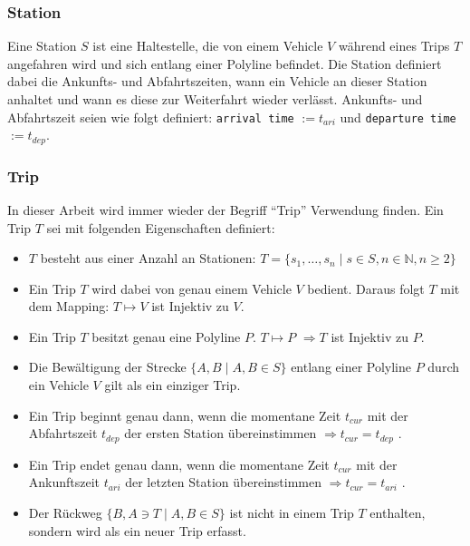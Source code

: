 \begin{newpage}
    \subsubsection{Station}
    \label{ssub:station}
      Eine Station $S$ ist eine Haltestelle, die von einem Vehicle $V$ während eines Trips $T$ angefahren wird und sich entlang einer Polyline befindet. Die Station definiert dabei die Ankunfts- und Abfahrtszeiten, wann ein Vehicle an dieser Station anhaltet und wann es diese zur Weiterfahrt wieder verlässt. Ankunfts- und Abfahrtszeit seien wie folgt definiert: \texttt{arrival time} $ := t_{ari}$ und \texttt{departure time} $ := t_{dep}$.

    \subsubsection{Trip}
    \label{ssub:trip}
      In dieser Arbeit wird immer wieder der Begriff "`Trip"' Verwendung finden. Ein Trip $T$ sei mit folgenden Eigenschaften definiert:
      \begin{itemize}
        \item $T$ besteht aus einer Anzahl an Stationen: $T = \{s_1, \dotsc, s_n \;|\; s \in S, n \in \mathbb{N}, n \geq 2 \}$

        \item Ein Trip $T$ wird dabei von genau einem Vehicle $V$ bedient. Daraus folgt $T$ mit dem Mapping: $T \mapsto V$ ist Injektiv zu $V$. 

        \item Ein Trip $T$ besitzt genau eine Polyline $P$. $T \mapsto P$ $ \Rightarrow T$ ist Injektiv zu $P$. 

        \item Die Bewältigung der Strecke $\{A,B \;|\; A, B \in S\}$ entlang einer Polyline $P$ durch ein Vehicle $V$ gilt als ein einziger Trip.

        \item Ein Trip beginnt genau dann, wenn die momentane Zeit $t_{cur}$ mit der Abfahrtszeit $t_{dep}$ der ersten Station übereinstimmen $\Rightarrow t_{cur} = t_{dep} $ .

        \item Ein Trip endet genau dann, wenn die momentane Zeit $t_{cur}$ mit der Ankunftszeit $t_{ari}$ der letzten Station übereinstimmen $\Rightarrow t_{cur} = t_{ari} $ .

        \item Der Rückweg $\{B, A \ni T \;|\; A, B \in S\}$ ist nicht in einem Trip $T$ enthalten, sondern wird als ein neuer Trip erfasst.
      \end{itemize}
      

\end{newpage}
